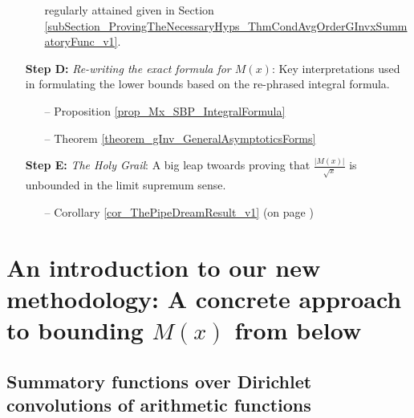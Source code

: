 \documentclass[11pt,reqno,a4letter]{article}
\numberwithin{figure}{section}
\numberwithin{table}{section}
\theoremstyle{plain}
\numberwithin{theorem}{section}
\theoremstyle{definition}
\begin{document}
\begin{itemize}[noitemsep,topsep=0pt]
\begin{itemize}[noitemsep,topsep=0pt]
{                      regularly attained given in 
                      Section \ref{subSection_ProvingTheNecessaryHyps_ThmCondAvgOrderGInvxSummatoryFunc_v1}. } 
     \end{itemize} 
\item[\textbf{Step D:}] \textit{Re-writing the exact formula for $M(x)$}: Key interpretations used in 
     formulating the lower bounds based on the re-phrased integral formula. 
     \begin{itemize}[noitemsep,topsep=0pt]
     \item[--] \small{Proposition \ref{prop_Mx_SBP_IntegralFormula}} 
     \item[--] \small{Theorem \ref{theorem_gInv_GeneralAsymptoticsForms}} 
     \end{itemize} 
\item[\textbf{Step E:}] \textit{The Holy Grail}: A big leap twoards proving that 
     $\frac{|M(x)|}{\sqrt{x}}$ is unbounded in the limit supremum sense. 
     \begin{itemize}[noitemsep,topsep=0pt]
     \item[--] \small{Corollary \ref{cor_ThePipeDreamResult_v1} (on page \pageref{proofOf_cor_ThePipeDreamResult_v1})} 
     \end{itemize} 

\end{itemize} 

\newpage 
\section{An introduction to our new methodology: A concrete approach to bounding $M(x)$ from below} 

\subsection{Summatory functions over Dirichlet convolutions of arithmetic functions} 
\end{document}
